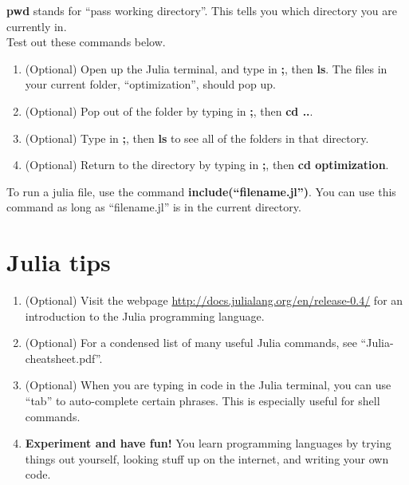 \documentclass[12pt]{article}
\begin{document}
{\bf pwd} stands for ``pass working directory''.  This tells you which directory you are currently in.  \\

Test out these commands below.  

\begin{enumerate}

\item (Optional) Open up the Julia terminal, and type in {\bf ;}, then {\bf ls}.  The files in your current folder, ``optimization'', should pop up.  

\item (Optional) Pop out of the folder by typing in {\bf ;}, then {\bf cd ..}.  

\item (Optional) Type in {\bf ;}, then {\bf ls} to see all of the folders in that directory.  

\item (Optional) Return to the directory by typing in {\bf ;}, then {\bf cd optimization}.

\end{enumerate}

To run a julia file, use the command {\bf include(``filename.jl'')}.  You can use this command as long as ``filename.jl'' is in the current
directory.  

\section{Julia tips}

\begin{enumerate}

\item (Optional) Visit the webpage \url{http://docs.julialang.org/en/release-0.4/} for an introduction to the Julia programming language.  

\item (Optional) For a condensed list of many useful Julia commands, see ``Julia-cheatsheet.pdf''.  

\item (Optional) When you are typing in code in the Julia terminal, you can use ``tab'' to auto-complete certain phrases.  This is especially useful for shell commands.  

\item {\bf Experiment and have fun!}  You learn programming languages by trying things out yourself, looking stuff up on the internet, and writing your own code.  
\end{enumerate}
\end{document}
